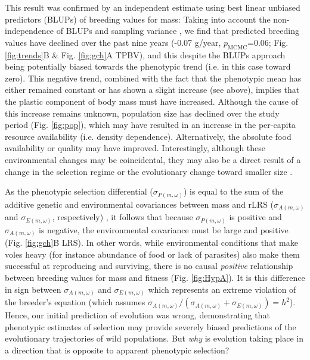 This result was confirmed by an independent estimate using best linear unbiased predictors (BLUPs) of breeding values for mass: Taking into account the non-independence of BLUPs and sampling variance \parencite{Postma2006,Hadfield2010b}, we find that predicted breeding values have declined over the past nine years (-0.07 g/year, $p_\mathrm{MCMC}$=0.06; Fig. \ref{fig:trends}B \& Fig. \ref{fig:gch}A TPBV), and this despite the BLUPs approach being potentially biased towards the phenotypic trend \parencite{Postma2006} (i.e. in this case toward zero). This negative trend, combined with the fact that the phenotypic mean has either remained constant or has shown a slight increase (see above), implies that the plastic component of body mass must have increased. Although the cause of this increase remains unknown, population size has declined over the study period (Fig. \ref{fig:pop}), which may have resulted in an increase in the per-capita resource availability (i.e. density dependence). Alternatively, the absolute food availability or quality may have improved. Interestingly, although these environmental changes may be coincidental, they may also be a direct result of a change in the selection regime or the evolutionary change toward smaller size \parencite{Cooke1990, Hadfield2011}.

As the phenotypic selection differential ($\sigma_{P(m,\omega)}$) is equal to the sum of the additive genetic and environmental covariances between mass and rLRS ($\sigma_{A(m,\omega)}$ and $\sigma_{E(m,\omega)}$, respectively) \parencite{Robertson1966,Price1970,Morrissey2012sts}, it follows that because $\sigma_{P(m,\omega)}$ is positive and $\sigma_{A(m,\omega)}$ is negative, the environmental covariance must be large and positive (Fig. \ref{fig:gch}B LRS). In other words, while environmental conditions that make voles heavy (for instance abundance of food or lack of parasites) also make them successful at reproducing and surviving, there is no causal \emph{positive} relationship between breeding values for mass and fitness (Fig. \ref{fig:HypA}). It is this difference in sign between $\sigma_{A(m,\omega)}$ and $\sigma_{E(m,\omega)}$ which represents an extreme violation of the breeder's equation (which assumes ${\sigma_{A(m,\omega)}}/({\sigma_{A(m,\omega)}+\sigma_{E(m,\omega)}})=h^2$). Hence, our initial prediction of evolution was wrong, demonstrating that phenotypic estimates of selection may provide severely biased predictions of the evolutionary trajectories of wild populations. But \emph{why} is evolution taking place in a direction that is opposite to apparent phenotypic selection?


